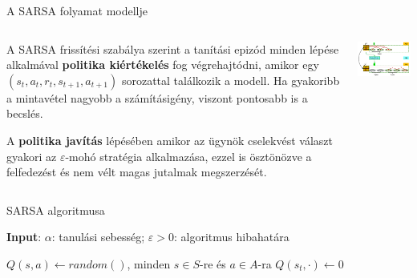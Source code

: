 \documentclass[english, aspectratio=169]{beamer}
\begin{document}
\begin{frame}{A SARSA folyamat modellje}
\begin{columns}
\begin{column}{.5\textwidth}
A SARSA frissítési szabálya szerint a tanítási epizód minden lépése alkalmával \textbf{politika kiértékelés} fog végrehajtódni, amikor egy $(s_t,a_t,r_t,s_{t+1},a_{t+1})$ sorozattal találkozik a modell. Ha gyakoribb a mintavétel nagyobb a számításigény, viszont pontosabb is a becslés.\par\smallskip
A \textbf{politika javítás} lépésében amikor az ügynök cselekvést választ gyakori az $\varepsilon$-mohó stratégia alkalmazása, ezzel is ösztönözve a felfedezést és nem vélt magas jutalmak megszerzését.
\end{column}
\begin{column}{.5\textwidth}
\begin{center}
\includegraphics[width=7cm, keepaspectratio]{images/mc_td_10.png}
\end{center}
\end{column}
\end{columns}
\end{frame}

\begin{frame}{SARSA algoritmusa}
\begin{algorithm}[H]
\caption{SARSA algoritmus $Q \approx q_*$ megbecslésére}
\SetAlgoLined
\textbf{Input}: $\alpha$: tanulási sebesség; $\varepsilon > 0$: algoritmus hibahatára\par\smallskip
$Q(s,a) \leftarrow random()$, minden $s \in S$-re és $a \in A$-ra\;
$Q(s_t,\cdot) \leftarrow 0$
\end{algorithm}
\end{frame}
\end{document}
